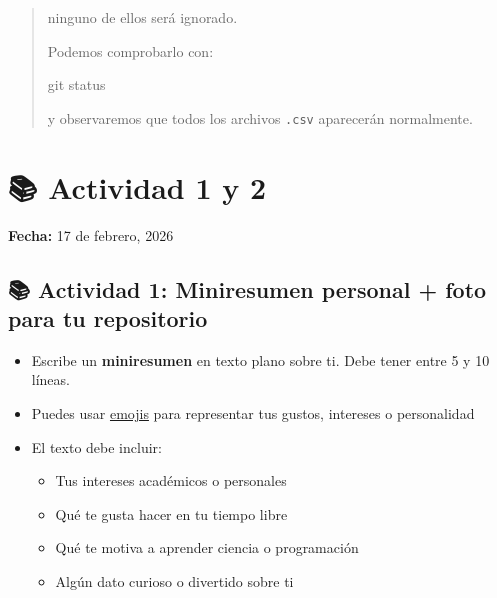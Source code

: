 \documentclass[
  spanish,
  12pt,
  letterpaper,
  DIV=11,
  numbers=noendperiod]{scrreprt}
\newenvironment{Shaded}{\begin{snugshade}}{\end{snugshade}}
\newcommand{\FunctionTok}[1]{\textcolor[rgb]{0.28,0.35,0.67}{#1}}
\newcommand{\NormalTok}[1]{\textcolor[rgb]{0.00,0.23,0.31}{#1}}
\providecommand{\tightlist}{%
  \setlength{\itemsep}{0pt}\setlength{\parskip}{0pt}}
\begin{document}
\begin{tcolorbox}
\begin{quote}
ninguno de ellos será ignorado.

Podemos comprobarlo con:

\begin{Shaded}
\begin{Highlighting}[]
\FunctionTok{git}\NormalTok{ status}
\end{Highlighting}
\end{Shaded}

y observaremos que todos los archivos \texttt{.csv} aparecerán
normalmente.
\end{quote}

\end{tcolorbox}

\chapter{\texorpdfstring{\textbf{📚} Actividad 1 y
2}{📚 Actividad 1 y 2}}\label{actividad-1-y-2}

\textbf{Fecha:} 17 de febrero, 2026

\section{\texorpdfstring{\textbf{📚} Actividad 1: Miniresumen personal +
foto para tu
repositorio}{📚 Actividad 1: Miniresumen personal + foto para tu repositorio}}\label{actividad-1-miniresumen-personal-foto-para-tu-repositorio}

\begin{itemize}
\tightlist
\item
  Escribe un \textbf{miniresumen} en texto plano sobre ti. Debe tener
  entre 5 y 10 líneas.
\item
  Puedes usar \href{https://gist.github.com/rxaviers/7360908}{emojis}
  para representar tus gustos, intereses o personalidad
\item
  El texto debe incluir:

  \begin{itemize}
  \item
    Tus intereses académicos o personales
  \item
    Qué te gusta hacer en tu tiempo libre
  \item
    Qué te motiva a aprender ciencia o programación
  \item
    Algún dato curioso o divertido sobre ti
  \end{itemize}
\end{itemize}
\end{document}
